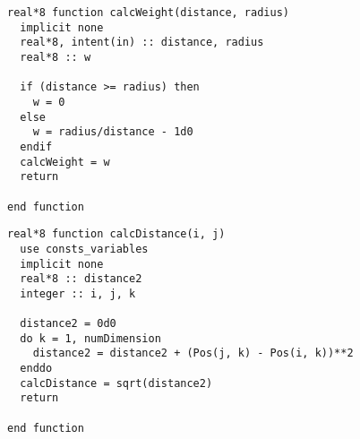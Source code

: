 \begin{lstlisting}[caption=重み係数計算関数]
real*8 function calcWeight(distance, radius)
  implicit none
  real*8, intent(in) :: distance, radius
  real*8 :: w

  if (distance >= radius) then
    w = 0
  else
    w = radius/distance - 1d0
  endif
  calcWeight = w
  return

end function
\end{lstlisting}
\begin{lstlisting}[caption=粒子間距離計算関数]
real*8 function calcDistance(i, j)
  use consts_variables
  implicit none
  real*8 :: distance2
  integer :: i, j, k

  distance2 = 0d0
  do k = 1, numDimension
    distance2 = distance2 + (Pos(j, k) - Pos(i, k))**2
  enddo
  calcDistance = sqrt(distance2)
  return

end function
\end{lstlisting}